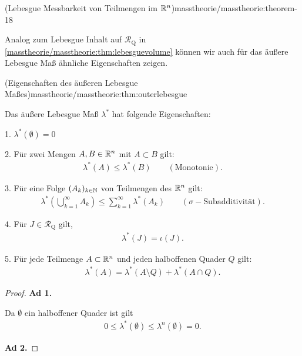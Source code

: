 \begin{theorem}{(Lebesgue Messbarkeit von Teilmengen im \protect\(\mathbb{R}^n\protect\))}{masstheorie/masstheorie:theorem-18}
\par
Analog zum Lebesgue Inhalt auf \(\mathcal{R}_\text{Q}\) in \cref{masstheorie/masstheorie:thm:lebesguevolume} können wir auch für das äußere Lebesgue Maß ähnliche Eigenschaften zeigen.
\begin{theorem}{(Eigenschaften des äußeren Lebesgue Maßes)}{masstheorie/masstheorie:thm:outerlebesgue}



\par
Das äußere Lebesgue Maß \(\lambda^*\) hat folgende Eigenschaften:

\par
1. \(\lambda^*(\emptyset) = 0\)

\par
2. Für zwei Mengen \(A, B \in \mathbb{R}^n\) mit \(A \subset B\) gilt:
\begin{align*}
\lambda^*(A) \leq \lambda^*(B) \qquad (\text{Monotonie}).
\end{align*}
\par
3. Für eine Folge \((A_k)_{k\in\mathbb{N}}\) von Teilmengen des \(\mathbb{R}^n\) gilt:
\begin{align*}
\lambda^*\left( \bigcup_{k=1}^\infty A_k \right) \leq \sum_{k=1}^\infty \lambda^*(A_k) \qquad (\sigma\!-\!\text{Subadditivität}).
\end{align*}
\par
4. Für \(J\in\mathcal{R}_{\text{Q}}\) gilt,
\begin{align*}
\lambda^*(J) = \iota(J).
\end{align*}
\par
5. Für jede Teilmenge \(A \subset \mathbb{R}^n\) und jeden halboffenen Quader \(Q\) gilt:
\begin{align*}
\lambda^*(A) = \lambda^*(A \setminus Q) + \lambda^*(A \cap Q).
\end{align*}\end{theorem}

\begin{proof}
 \textbf{Ad 1.}

\par
Da \(\emptyset\) ein halboffener Quader ist gilt
\begin{align*}
0\leq \lambda^\ast(\emptyset) \leq \lambda^n(\emptyset) = 0.
\end{align*}
\par
\textbf{Ad 2.}


\end{proof}
\end{theorem}
